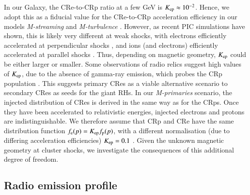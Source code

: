 \documentclass[fleqn,usenatbib,useAMS]{mnras}
\begin{document}
In our Galaxy, the CRe-to-CRp ratio at a few GeV is $K_{{\mathrm{ep}}} \approx
10^{-2}$. Hence, we adopt this as a fiducial value for the CRe-to-CRp
acceleration efficiency in our models {\em M-streaming} and {\em M-turbulence}
\citep[see][for more discussion]{pinzke13}. However, as recent PIC simulations
have shown, this is likely very different at weak shocks, with electrons
efficiently accelerated at perpendicular shocks
\citep{2014ApJ...794..153G,2014ApJ...797...47G}, and ions (and electrons)
efficiently accelerated at parallel shocks \citep{2014ApJ...783...91C,
  Park2015}. Thus, depending on magnetic geometry, $K_{{\mathrm{ep}}}$ could be
either larger or smaller. Some observations of radio relics suggest high values
of $K_{{\mathrm{ep}}}$, due to the absence of gamma-ray emission, which probes the
CRp population \citep{2014MNRAS.437.2291V}. This suggests primary CRes as a
viable alternative scenario to secondary CRes as seeds for the giant RHs. In our
{\em M-primaries} scenario, the injected distribution of CRes is derived in the
same way as for the CRps. Once they have been accelerated to relativistic
energies, injected electrons and protons are indistinguishable. We therefore
assume that CRp and CRe have the same distribution function $f_{\mathrm{e}}(p) =
K_{\mathrm{ep}} f_{\mathrm{p}}(p)$, with a different normalisation (due to differing
acceleration efficiencies) $K_{\mathrm{ep}}=0.1$ \citep[which is viable for primarily
  perpendicular shocks,][]{2014ApJ...794..153G}. Given the unknown magnetic
geometry at cluster shocks, we investigate the consequences of this additional
degree of freedom.


\subsection{Radio emission profile}
\end{document}
